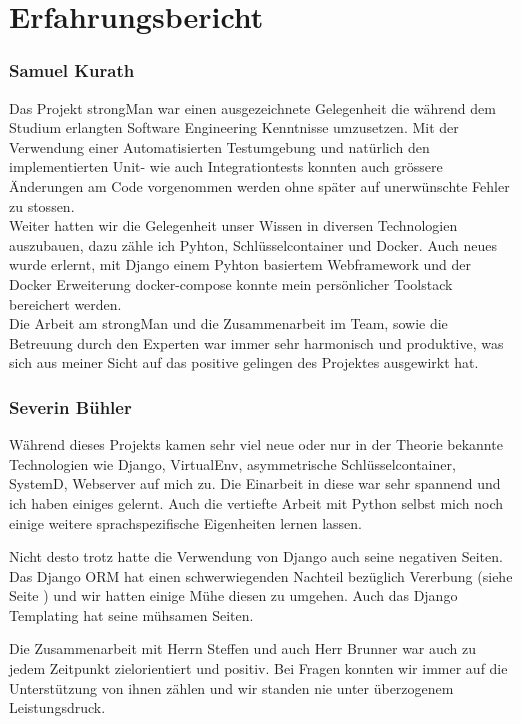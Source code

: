 \section{Erfahrungsbericht}
\subsubsection{Samuel Kurath}
Das Projekt strongMan war einen ausgezeichnete Gelegenheit die während dem Studium erlangten Software Engineering Kenntnisse umzusetzen. Mit der Verwendung einer Automatisierten Testumgebung und natürlich den implementierten Unit- wie auch Integrationtests konnten auch grössere Änderungen am Code vorgenommen werden ohne später auf unerwünschte Fehler zu stossen.\\
Weiter hatten wir die Gelegenheit unser Wissen in diversen Technologien auszubauen, dazu zähle ich Pyhton, Schlüsselcontainer und Docker. Auch neues wurde erlernt, mit Django einem Pyhton basiertem Webframework und der Docker Erweiterung docker-compose konnte mein persönlicher Toolstack bereichert werden.\\
Die Arbeit am strongMan und die Zusammenarbeit im Team, sowie die Betreuung durch den Experten war immer sehr harmonisch und produktive, was sich aus meiner Sicht auf das positive gelingen des Projektes ausgewirkt hat.


\subsubsection{Severin Bühler}
Während dieses Projekts kamen sehr viel neue oder nur in der Theorie bekannte Technologien wie Django, VirtualEnv, asymmetrische Schlüsselcontainer, SystemD, Webserver auf mich zu. Die Einarbeit in diese war sehr spannend und ich haben einiges gelernt. Auch die vertiefte Arbeit mit Python selbst mich noch einige weitere sprachspezifische Eigenheiten lernen lassen.

Nicht desto trotz hatte die Verwendung von Django auch seine negativen Seiten. Das Django ORM hat einen schwerwiegenden Nachteil bezüglich Vererbung (siehe Seite \pageref{subklassen}) und wir hatten einige Mühe diesen zu umgehen. Auch das Django Templating hat seine mühsamen Seiten.

Die Zusammenarbeit mit Herrn Steffen und auch Herr Brunner war auch zu jedem Zeitpunkt zielorientiert und positiv. Bei Fragen konnten wir immer auf die Unterstützung von ihnen zählen und wir standen nie unter überzogenem Leistungsdruck. 
